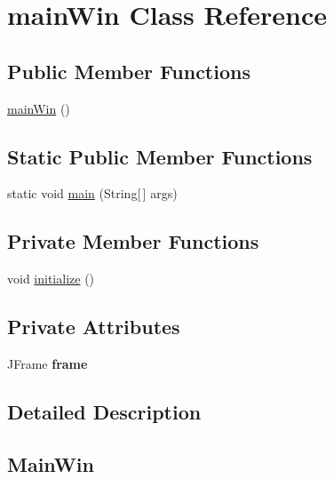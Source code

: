 \hypertarget{classmain_win}{}\section{main\+Win Class Reference}
\label{classmain_win}
\subsection*{Public Member Functions}
\begin{DoxyCompactItemize}
\item 
\hyperlink{classmain_win_a49c22fb02a4187e69d8dd16607446e16}{main\+Win} ()
\end{DoxyCompactItemize}
\subsection*{Static Public Member Functions}
\begin{DoxyCompactItemize}
\item 
static void \hyperlink{classmain_win_a8fcc6dd4f93af4dd5a72a74c461a1fe0}{main} (String\mbox{[}$\,$\mbox{]} args)
\end{DoxyCompactItemize}
\subsection*{Private Member Functions}
\begin{DoxyCompactItemize}
\item 
void \hyperlink{classmain_win_ad7d141c1498081d02e50ec3f8beb5013}{initialize} ()
\end{DoxyCompactItemize}
\subsection*{Private Attributes}
\begin{DoxyCompactItemize}
\item 
\mbox{\label{classmain_win_acdd1b1173499bd356487cde28e481fbe}} 
J\+Frame {\bfseries frame}
\end{DoxyCompactItemize}


\subsection{Detailed Description}
\subsection*{Main\+Win }


